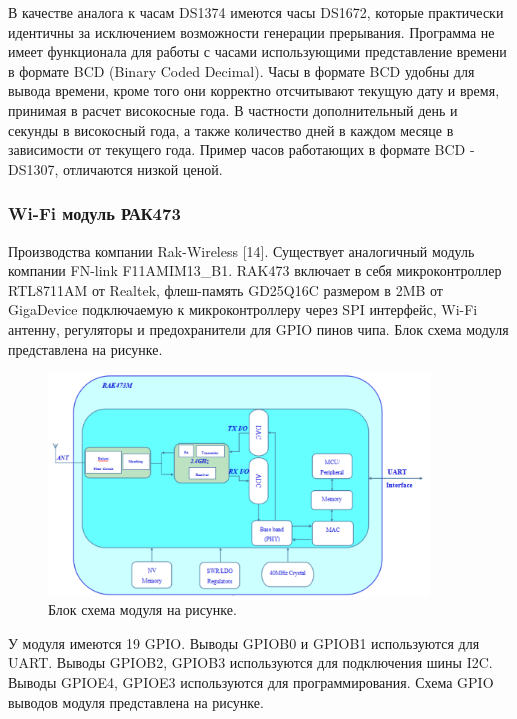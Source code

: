 В качестве аналога к часам DS1374 имеются часы DS1672, которые практически идентичны за исключением возможности генерации прерывания. 
Программа не имеет функционала для работы с часами использующими представление времени в формате BCD (Binary Coded Decimal). Часы в формате BCD удобны для вывода времени, кроме того они корректно отсчитывают текущую дату и время, принимая в расчет високосные года. В частности дополнительный день и секунды в високосный года, а также количество дней в каждом месяце в зависимости от текущего года. 
Пример часов работающих в формате BCD - DS1307, отличаются низкой ценой.


\subsubsection{ Wi-Fi модуль РАК473 }
Производства компании Rak-Wireless [14]. 
Существует аналогичный модуль компании FN-link F11AMIM13\_B1. RAK473 включает в себя микроконтроллер RTL8711AM от Realtek, флеш-память GD25Q16C размером в 2MB от GigaDevice подключаемую к микроконтроллеру через SPI интерфейс, Wi-Fi антенну, регуляторы и предохранители для GPIO пинов чипа. Блок схема модуля представлена на рисунке.

\begin{figure}[h!]
    \centering
    \includegraphics[width=0.9\textwidth]{rak473_block_diagram.png}
    \caption{Блок схема модуля на рисунке.}
\end{figure}

У модуля имеются 19 GPIO. 
Выводы GPIOB0 и GPIOB1 используются для UART.
Выводы GPIOB2, GPIOB3 используются для подключения шины I2C.
Выводы GPIOE4, GPIOE3 используются для программирования.
Схема GPIO выводов модуля представлена на рисунке.

